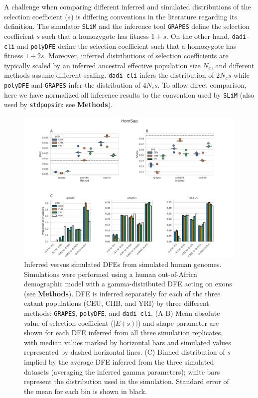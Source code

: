 \documentclass[hidelinks]{article}
\newcommand{\stdpopsim}{\texttt{stdpopsim}\xspace}
\newcommand{\slim}{\texttt{SLiM}\xspace}
\newcommand{\polydfe}{\texttt{polyDFE}\xspace}
\newcommand{\dadicli}{\texttt{dadi-cli}\xspace}
\newcommand{\grapes}{\texttt{GRAPES}\xspace}
\begin{document}
    A challenge when comparing different inferred and simulated distributions of the selection coefficient ($s$)
    is differing conventions in the literature regarding its definition.
    The simulator \slim and the inference tool \grapes define the selection coefficient $s$ such that a homozygote has fitness $1+s$.
    On the other hand, \dadicli and \polydfe define the selection coefficient such that a homozygote has fitness $1+2s$.
    Moreover, inferred distributions of selection coefficients are typically scaled by an inferred ancestral
    effective population size $N_e$, and different methods assume different scaling.
    \dadicli infers the distribution of $2 N_e s$ while \polydfe and \grapes infer the distribution of $4 N_e s$.
    To allow direct comparison, here we have normalized all inference results to the convention used by \slim
    (also used by \stdpopsim; see \textbf{Methods}).

    \begin{figure}[b!]
        \centering
        \includegraphics[width=\linewidth]{figures/HomSap/OOA/HomSap_discrete_DFE}
        \caption{Inferred versus simulated DFEs from simulated human genomes.
        Simulations were performed using a human out-of-Africa demographic model with a gamma-distributed DFE
        acting on exons (see \textbf{Methods}).
        DFE is inferred separately for each of the three extant populations (CEU, CHB, and YRI)
        by three different methods: \grapes, \polydfe , and \dadicli.
        (A-B) Mean absolute value of selection coefficient ($\lvert E(s) \rvert $) and shape parameter are
        shown for each DFE inferred from all three simulation replicates,
        with median values marked by horizontal bars
        and simulated values represented by dashed horizontal lines.
        (C) Binned distribution of $s$ implied by the average DFE inferred from the three simulated datasets (averaging the inferred gamma parameters);
        white bars represent the distribution used in the simulation. Standard error of the mean for each bin is shown in black. 
        }
        \label{fig:homsap-dfe.ooa}
    \end{figure}
\end{document}
